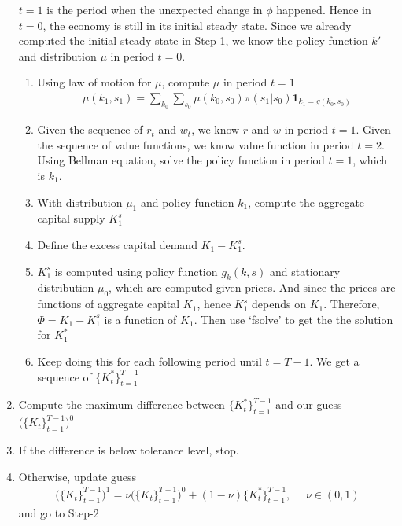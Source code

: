 \documentclass{article}
\begin{document}
\begin{spacing}{1.5}
\begin{enumerate}
$t=1$ is the period when the unexpected change in $\phi$ happened. Hence in $t=0$, the economy is still in its initial steady state. Since we already computed the initial steady state in Step-1, we know the policy function $k'$ and distribution $\mu$ in period $t=0$. 
\begin{enumerate}
\item Using law of motion for $\mu$, compute $\mu$ in period $t=1$
\begin{align*}
\mu(k_1,s_1)=\sum_{k_0}\sum_{s_0}\mu(k_0,s_0)\pi(s_1|s_0)\textbf{1}_{k_1=g(k_0,s_0)}
\end{align*}
\item Given the sequence of $r_t$ and $w_t$, we know $r$ and $w$ in period $t=1$. Given the sequence of value functions, we know value function in period $t=2$. Using Bellman equation, solve the policy function in period $t=1$, which is $k_1$.
\item With distribution $\mu_1$ and policy function $k_1$, compute the aggregate capital supply $K^s_1$
\item Define the excess capital demand $K_1-K^s_1$.
\item $K^s_1$ is computed using policy function $g_k(k,s)$ and stationary distribution $\mu_0$, which are computed given prices. And since the prices are functions of aggregate capital $K_1$, hence $K^s_1$ depends on $K_1$. Therefore, $\Phi=K_1-K^s_1$ is a function of $K_1$. Then use `fsolve' to get the the solution for $K^*_1$
\item Keep doing this for each following period until $t=T-1$. We get a sequence of $\{K^*_t\}_{t=1}^{T-1}$
\end{enumerate}
\item Compute the maximum difference between $\{K^*_t\}_{t=1}^{T-1}$ and our guess $\Big(\{K_t\}_{t=1}^{T-1}\Big)^0$
\item If the difference is below tolerance level, stop.
\item Otherwise, update guess
\begin{align*}
\Big(\{K_t\}_{t=1}^{T-1}\Big)^1=\nu\Big(\{K_t\}_{t=1}^{T-1}\Big)^0+(1-\nu)\{K_t^*\}_{t=1}^{T-1}, \ \ \ \ \ \ \nu\in(0,1)
\end{align*}
and go to Step-2
\end{enumerate}

\newpage

\end{spacing}
\end{document}
